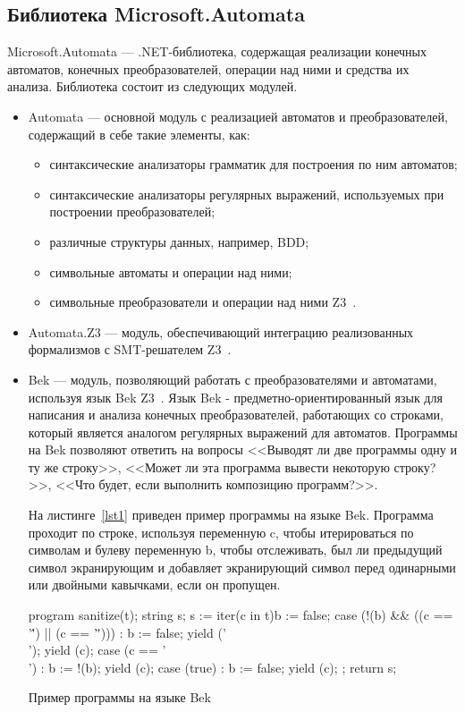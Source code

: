\subsection{Библиотека Microsoft.Automata}
Microsoft.Automata --- .NET-библиотека, содержащая реализации конечных автоматов, конечных преобразователей, операции над ними и средства их анализа. Библиотека состоит из следующих модулей.
\begin{itemize}
\item Automata --- основной модуль с реализацией автоматов и преобразователей, содержащий в себе такие элементы, как:
    \begin{itemize}
    \item синтаксические анализаторы грамматик для построения по ним автоматов;
    \item синтаксические анализаторы регулярных выражений, используемых при построении преобразователей;
    \item различные структуры данных, например, BDD;
    \item символьные автоматы и операции над ними;
    \item символьные преобразователи и операции над ними Z3~\cite{STcompose}. 
    \end{itemize}
\item Automata.Z3 --- модуль, обеспечивающий интеграцию реализованных формализмов с SMT-решателем Z3~\cite{Z3Url, articleZ3}.
\item Bek --- модуль, позволяющий работать с преобразователями и автоматами, используя язык Bek Z3~\cite{BekUrl, BekArticle}. Язык Bek - предметно-ориентированный язык для написания и анализа конечных преобразователей, работающих со строками, который является аналогом регулярных выражений для автоматов. Программы на Bek позволяют ответить на вопросы <<Выводят ли две программы одну и ту же строку>>, <<Может ли эта программа вывести некоторую строку?>>, <<Что будет, если выполнить композицию программ?>>.

На листинге~\ref{lst1} приведен пример программы на языке Bek. Программа проходит по строке, используя переменную c, чтобы итерироваться по символам и булеву переменную b, чтобы отслеживать, был ли предыдущий символ экранирующим и добавляет экранирующий символ перед одинарными или двойными кавычками, если он пропущен. 

\begin{listing}[H]
    \begin{pyglist}[language=csharp,numbers=left,numbersep=5pt]
program sanitize(t);
    string s; 
    s := iter(c in t){b := false;}{
            case (!(b) && ((c == '\'') || (c == '\"'))) :
                b := false;
                yield ('\\');
                yield (c);
            case (c == '\\') :
                b := !(b);
                yield (c);
            case (true) :
                b := false;
                yield (c);
            };
    return s;
    \end{pyglist}
\caption{Пример программы на языке Bek}
\label{lst1}
\end{listing}
\end{itemize}
